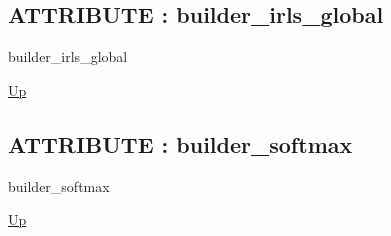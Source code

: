 \par
\par
\subsection*{ATTRIBUTE : builder\_irls\_global}
\hypertarget{ecldoc:logisticregression.constants.builder_irls_global}{}
\begin{minipage}[t]{\textwidth}
\begin{flushleft}
 builder\_irls\_global 
\end{flushleft}
\end{minipage}
\hyperlink{ecldoc:LogisticRegression.Constants}{Up}

\par
\par
\subsection*{ATTRIBUTE : builder\_softmax}
\hypertarget{ecldoc:logisticregression.constants.builder_softmax}{}
\begin{minipage}[t]{\textwidth}
\begin{flushleft}
 builder\_softmax 
\end{flushleft}
\end{minipage}
\hyperlink{ecldoc:LogisticRegression.Constants}{Up}

\par
\par

